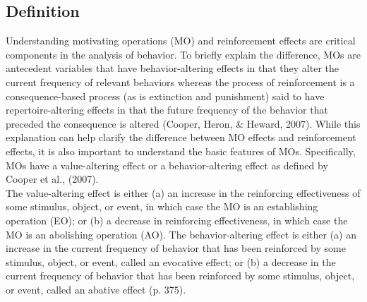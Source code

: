 \subsection{Definition}
Understanding motivating operations (MO) and reinforcement effects are critical components in the analysis of behavior.  To briefly explain the difference, MOs are antecedent variables that have behavior-altering effects in that they alter the current frequency of relevant behaviors whereas the process of reinforcement is a consequence-based process (as is extinction and punishment) said to have repertoire-altering effects in that the future frequency of the behavior that preceded the consequence is altered (Cooper, Heron, \& Heward, 2007).  While this explanation can help clarify the difference between MO effects and reinforcement effects, it is also important to understand the basic features of MOs.  Specifically, MOs have a value-altering effect or a behavior-altering effect as defined by Cooper et al., (2007).\\

The value-altering effect is either (a) an increase in the reinforcing effectiveness of some stimulus, object, or event, in which case the MO is an establishing operation (EO); or (b) a decrease in reinforcing effectiveness, in which case the MO is an abolishing operation (AO).  The behavior-altering effect is either (a) an increase in the current frequency of behavior that has been reinforced by some stimulus, object, or event, called an evocative effect; or (b) a decrease in the current frequency of behavior that has been reinforced by some stimulus, object, or event, called an abative effect (p. 375).
%
